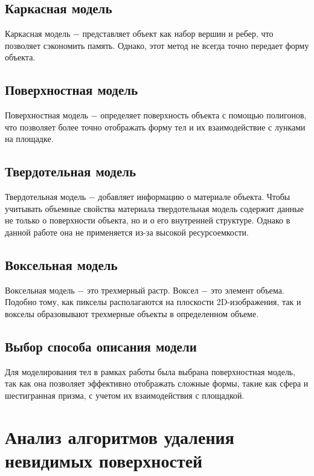 \subsection{Каркасная модель}

Каркасная модель $-$ представляет объект как набор вершин и ребер, что позволяет сэкономить память. Однако, этот метод не всегда точно передает форму объекта.

\subsection{Поверхностная модель}

Поверхностная модель $-$ определяет поверхность объекта с помощью полигонов, что позволяет более точно отображать форму тел и их взаимодействие с лунками на площадке.

\subsection{Твердотельная модель}

Твердотельная модель $-$ добавляет информацию о материале объекта. Чтобы учитывать объемные свойства материала твердотельная модель содержит данные не только о поверхности объекта, но и о его внутренней структуре. Однако в данной работе она не применяется из-за высокой ресурсоемкости.

\subsection{Воксельная модель}

Воксельная модель $-$ это трехмерный растр. Воксел $-$ это элемент объема. Подобно тому, как пикселы располагаются на плоскости 2D-изображения, так и вокселы образовывают трехмерные объекты в определенном объеме.

\subsection{Выбор способа описания модели}

Для моделирования тел в рамках работы была выбрана поверхностная модель, так как она позволяет эффективно отображать сложные формы, такие как сфера и шестигранная призма, с учетом их взаимодействия с площадкой.

\vspace{5mm}

\section{Анализ алгоритмов удаления невидимых поверхностей}

